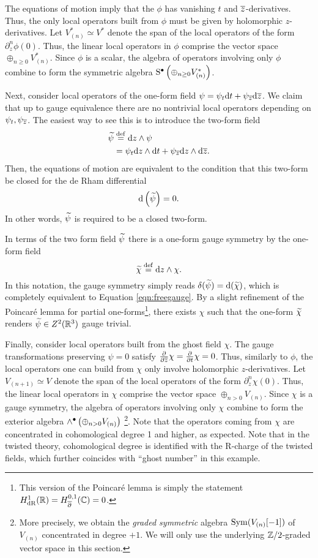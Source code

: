 \documentclass[11pt]{amsart}
\begin{document}
The equations of motion imply that the $\phi$ has vanishing $t$ and ${\overline{z}}$-derivatives. 
Thus, the only local operators built from $\phi$ must be given by holomorphic $z$-derivatives. 
Let $V^*_{(n)} \simeq V^*$ denote the span of the local operators of the form $\partial_z^n \phi(0)$.
Thus, the linear local operators in $\phi$ comprise the vector space $\oplus_{n \geq 0} V_{(n)}^*$.
Since $\phi$ is a scalar, the algebra of operators involving only $\phi$ combine to form the symmetric algebra ${\rm S}^\bullet \left(\oplus_{n \geq 0} V^*_{(n)}\right)$.

Next, consider local operators of the one-form field $\psi = \psi_t {\rm d} t + \psi_{\overline{z}} {\rm d} {\overline{z}}$. 
We claim that up to gauge equivalence there are no nontrivial local operators depending on $\psi_t, \psi_{\overline{z}}$.  
The easiest way to see this is to introduce the two-form field
\begin{align*}
\widetilde \psi & \overset{\rm def}{=} {\rm d} z \wedge \psi \\ & = \psi_t {\rm d} z \wedge {\rm d} t + \psi_{\overline{z}} {\rm d} z \wedge {\rm d} {\overline{z}} .
\end{align*}
Then, the equations of motion are equivalent to the condition that this two-form be closed for the de Rham differential
\[
{\rm d} \left(\widetilde \psi\right) = 0 .
\]
In other words, $\widetilde \psi$ is required to be a closed two-form.

In terms of the two form field $\widetilde \psi$ there is a one-form gauge symmetry by the one-form field 
\[
\widetilde \chi \overset{\rm def}{=} {\rm d} z \wedge \chi .
\]
In this notation, the gauge symmetry simply reads $\delta (\widetilde \psi) = {\rm d} (\widetilde \chi)$, which is completely equivalent to Equation \eqref{eqn:freegauge}.
By a slight refinement of the Poincar\'{e} lemma for partial one-forms\footnote{This version of the Poincar\'{e} lemma is simply the statement $H^1_{\rm dR} (\mathbb R) = H_{\overline{\partial}}^{0,1}(\mathbb C)= 0$.}, there exists $\chi$ such that the one-form $\widetilde \chi$ renders $\widetilde \psi \in Z^2(\mathbb R^3)$ gauge trivial. 


Finally, consider local operators built from the ghost field $\chi$. 
The gauge transformations preserving $\psi = 0$ satisfy $\frac{\partial}{\partial {\overline{z}}} \chi = \frac{\partial}{\partial t} \chi = 0$. 
Thus, similarly to $\phi$, the local operators one can build from $\chi$ only involve holomorphic $z$-derivatives. 
Let $V_{(n+1)} \simeq V$ denote the span of the local operators of the form $\partial_z^n \chi(0)$.
Thus, the linear local operators in $\chi$ comprise the vector space $\oplus_{n > 0} V_{(n)}$.
Since $\chi$ is a gauge symmetry, the algebra of operators involving only $\chi$ combine to form the exterior algebra $\wedge^\bullet \left(\oplus_{n > 0} V_{(n)}\right)$ \footnote{More precisely, we obtain the {\em graded symmetric} algebra $\operatorname{Sym}(V_{(n)}[-1])$ of $V_{(n)}$ concentrated in degree $+1$.
We will only use the underlying $\mathbb Z/2$-graded vector space in this section.}. Note that the operators coming from $\chi$ are concentrated in cohomological degree 1 and higher, as expected. Note that in the twisted theory, cohomological degree is identified with the R-charge of the twisted fields, which further coincides with ``ghost number'' in this example. 
\end{document}
